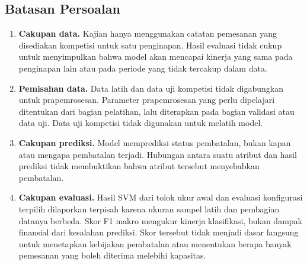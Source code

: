 \subsection{Batasan Persoalan}
\begin{enumerate}
    \item \textbf{Cakupan data.} Kajian hanya menggunakan catatan pemesanan yang
        disediakan kompetisi untuk satu penginapan. Hasil evaluasi tidak cukup
        untuk menyimpulkan bahwa model akan mencapai kinerja yang sama pada
        penginapan lain atau pada periode yang tidak tercakup dalam data.
    \item \textbf{Pemisahan data.} Data latih dan data uji kompetisi tidak
        digabungkan untuk prapemrosesan. Parameter prapemrosesan yang perlu
        dipelajari ditentukan dari bagian pelatihan, lalu diterapkan pada bagian
        validasi atau data uji. Data uji kompetisi tidak digunakan untuk melatih
        model.
    \item \textbf{Cakupan prediksi.} Model memprediksi status pembatalan, bukan
        kapan atau mengapa pembatalan terjadi. Hubungan antara suatu atribut dan
        hasil prediksi tidak membuktikan bahwa atribut tersebut menyebabkan
        pembatalan.
    \item \textbf{Cakupan evaluasi.} Hasil SVM dari tolok ukur awal dan
        evaluasi konfigurasi terpilih dilaporkan terpisah karena ukuran sampel
        latih dan pembagian datanya berbeda. Skor F1 makro mengukur kinerja klasifikasi,
        bukan dampak finansial dari kesalahan prediksi. Skor tersebut tidak
        menjadi dasar langsung untuk menetapkan kebijakan pembatalan atau
        menentukan berapa banyak pemesanan yang boleh diterima melebihi
        kapasitas.
\end{enumerate}
